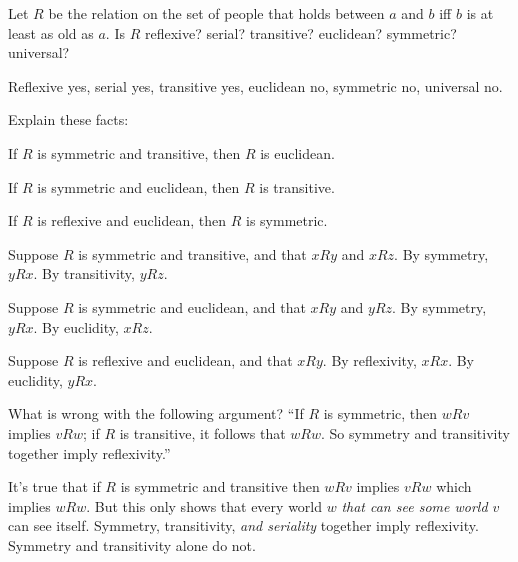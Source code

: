 \begin{exercise}
  Let $R$ be the relation on the set of people that holds between $a$ and $b$
  iff $b$ is at least as old as $a$. Is $R$ reflexive? serial? transitive?
  euclidean? symmetric? universal?
\end{exercise}
\begin{solution}
  Reflexive yes, serial yes, transitive yes, euclidean no, symmetric no,
  universal no.
\end{solution}

\begin{exercise}\label{ex:relations}
  Explain these facts:
  \begin{exlist}
  \item If $R$ is symmetric and transitive, then $R$ is euclidean.
  \item If $R$ is symmetric and euclidean, then $R$ is transitive.
  \item If $R$ is reflexive and euclidean, then $R$ is symmetric.
  \end{exlist}
\end{exercise}
\begin{solution}
  \begin{sollist}
    \item Suppose $R$ is symmetric and transitive, and that $xRy$ and $xRz$. By
    symmetry, $yRx$. By transitivity, $yRz$.
    \item Suppose $R$ is symmetric and euclidean, and that $xRy$ and $yRz$. By
    symmetry, $yRx$. By euclidity, $xRz$.
    \item Suppose $R$ is reflexive and euclidean, and that $xRy$. By
    reflexivity, $xRx$. By euclidity, $yRx$.
  \end{sollist}
\end{solution}

\begin{exercise}
  What is wrong with the following argument? ``If $R$ is symmetric,
  then $wRv$ implies $vRw$; if $R$ is transitive, it follows that
  $wRw$. So symmetry and transitivity together imply reflexivity.''
\end{exercise}
\begin{solution}
  It's true that if $R$ is symmetric and transitive then $wRv$ implies $vRw$
  which implies $wRw$. But this only shows that every world $w$ \emph{that can
    see some world $v$} can see itself. Symmetry, transitivity, \emph{and
    seriality} together imply reflexivity. Symmetry and transitivity alone do
  not.
\end{solution}

